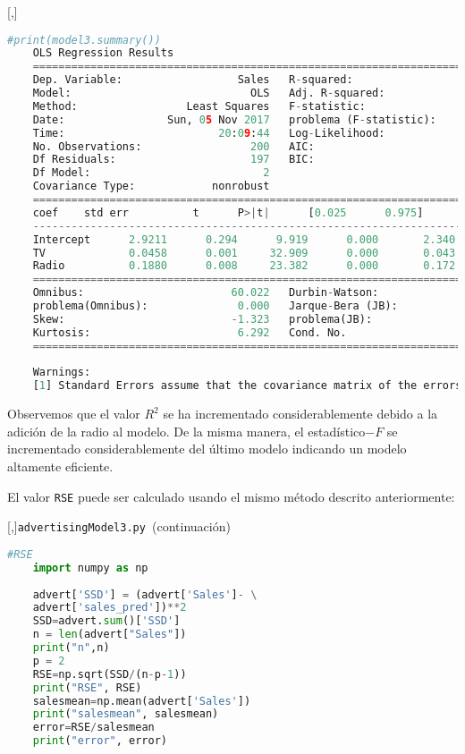 [,]{}
\begin{lstlisting}[language=Python]
	#print(model3.summary())
	OLS Regression Results
	==============================================================================
	Dep. Variable:                  Sales   R-squared:                       0.897
	Model:                            OLS   Adj. R-squared:                  0.896
	Method:                 Least Squares   F-statistic:                     859.6
	Date:                Sun, 05 Nov 2017   problema (F-statistic):           4.83e-98
	Time:                        20:09:44   Log-Likelihood:                -386.20
	No. Observations:                 200   AIC:                             778.4
	Df Residuals:                     197   BIC:                             788.3
	Df Model:                           2
	Covariance Type:            nonrobust
	==============================================================================
	coef    std err          t      P>|t|      [0.025      0.975]
	------------------------------------------------------------------------------
	Intercept      2.9211      0.294      9.919      0.000       2.340       3.502
	TV             0.0458      0.001     32.909      0.000       0.043       0.048
	Radio          0.1880      0.008     23.382      0.000       0.172       0.204
	==============================================================================
	Omnibus:                       60.022   Durbin-Watson:                   2.081
	problema(Omnibus):              0.000   Jarque-Bera (JB):              148.679
	Skew:                          -1.323   problema(JB):                     5.19e-33
	Kurtosis:                       6.292   Cond. No.                         425.
	==============================================================================
	
	Warnings:
	[1] Standard Errors assume that the covariance matrix of the errors is correctly specified.
\end{lstlisting}


Observemos que el valor $R^{2}$ se ha incrementado considerablemente debido a la adición de la radio al modelo. De la misma manera, el estadístico$-F$ se incrementado considerablemente del último modelo indicando un modelo altamente eficiente.


El valor \texttt{RSE} puede ser calculado usando el mismo método descrito anteriormente:

[,]{\texttt{advertisingModel3.py }(continuación)} 
\begin{lstlisting}[language=Python]
	#RSE
	import numpy as np
	
	advert['SSD'] = (advert['Sales']- \
	advert['sales_pred'])**2
	SSD=advert.sum()['SSD']
	n = len(advert["Sales"])
	print("n",n)
	p = 2
	RSE=np.sqrt(SSD/(n-p-1))
	print("RSE", RSE)
	salesmean=np.mean(advert['Sales'])
	print("salesmean", salesmean)
	error=RSE/salesmean
	print("error", error)
\end{lstlisting}


